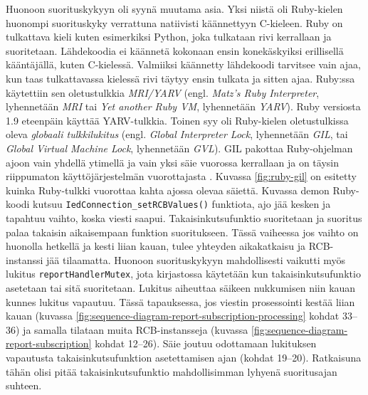 Huonoon suorituskykyyn oli syynä muutama asia. Yksi niistä oli Ruby-kielen huonompi suorituskyky verrattuna natiivisti käännettyyn C-kieleen. Ruby on tulkattava kieli kuten esimerkiksi Python, joka tulkataan rivi kerrallaan ja suoritetaan. Lähdekoodia ei käännetä kokonaan ensin konekäskyiksi erillisellä kääntäjällä, kuten C-kielessä. Valmiiksi käännetty lähdekoodi tarvitsee vain ajaa, kun taas tulkattavassa kielessä rivi täytyy ensin tulkata ja sitten ajaa. Ruby:ssa käytettiin sen oletustulkkia \emph{MRI/YARV} (engl. \emph{Matz's Ruby Interpreter}, lyhennetään \emph{MRI} tai \emph{Yet another Ruby VM}, lyhennetään \emph{YARV}). Ruby versiosta 1.9 eteenpäin käyttää YARV-tulkkia. Toinen syy oli Ruby-kielen oletustulkissa oleva \emph{globaali tulkkilukitus} (engl. \emph{Global Interpreter Lock}, lyhennetään \emph{GIL}, tai \emph{Global Virtual Machine Lock}, lyhennetään \emph{GVL}). GIL pakottaa Ruby-ohjelman ajoon vain yhdellä ytimellä ja vain yksi säie vuorossa kerrallaan ja on täysin riippumaton käyttöjärjestelmän vuorottajasta \mbox{\cite[s.~131--133]{Odaira2014}}. Kuvassa \ref{fig:ruby-gil} on esitetty kuinka Ruby-tulkki vuorottaa kahta ajossa olevaa säiettä. Kuvassa demon Ruby-koodi kutsuu \texttt{Ied\-Con\-nec\-ti\-on\-\_\-set\-RCB\-Va\-lu\-es\-()} funktiota, ajo jää kesken ja tapahtuu vaihto, koska viesti saapui. Takaisinkutsufunktio suoritetaan ja suoritus palaa takaisin aikaisempaan funktion suoritukseen. Tässä vaiheessa jos vaihto on huonolla hetkellä ja kesti liian kauan, tulee yhteyden aikakatkaisu ja RCB-instanssi jää tilaamatta. Huonoon suorituskykyyn mahdollisesti vaikutti myös lukitus \texttt{re\-port\-Hand\-ler\-Mu\-tex}, jota kirjastossa käytetään kun takaisinkutsufunktio asetetaan tai sitä suoritetaan. Lukitus aiheuttaa säikeen nukkumisen niin kauan kunnes lukitus vapautuu. Tässä tapauksessa, jos viestin prosessointi kestää liian kauan (kuvassa \ref{fig:sequence-diagram-report-subscription-processing} kohdat 33--36) ja samalla tilataan muita RCB-instansseja (kuvassa \ref{fig:sequence-diagram-report-subscription} kohdat 12--26). Säie joutuu odottamaan lukituksen vapautusta takaisinkutsufunktion asetettamisen ajan (kohdat 19--20). Ratkaisuna tähän olisi pitää takaisinkutsufunktio mahdollisimman lyhyenä suoritusajan suhteen. \mbox{\cite{Kozlovski2017, Storimer2013}}

